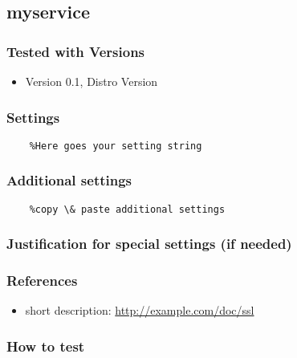 \subsection{myservice}


\subsubsection{Tested with Versions}
\begin{itemize}
  \item Version 0.1, Distro Version
\end{itemize}

\subsubsection{Settings}

\begin{lstlisting}
    %Here goes your setting string
\end{lstlisting}

\subsubsection{Additional settings}


\begin{lstlisting}
    %copy \& paste additional settings
\end{lstlisting}

\subsubsection{Justification for special settings (if needed)}


\subsubsection{References}
\begin{itemize}
  \item short description: \url{http://example.com/doc/ssl}
\end{itemize}


\subsubsection{How to test}

